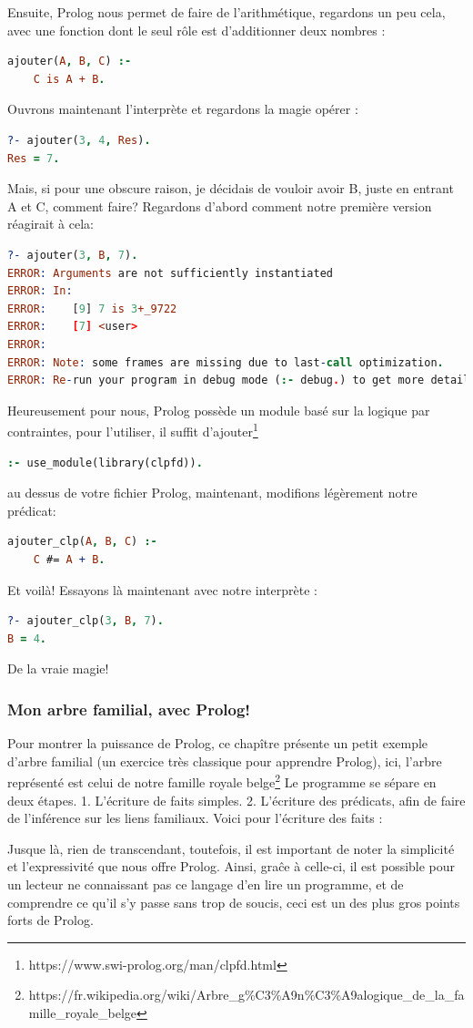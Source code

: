 \documentclass[a4paper, 12pt]{article}
\numberwithin{equation}{subsection}
\begin{document}
Ensuite, Prolog nous permet de faire de l'arithmétique, regardons un peu cela, avec une fonction dont le seul rôle est d'additionner deux nombres :
\begin{lstlisting}[language=Prolog]
ajouter(A, B, C) :-
    C is A + B.
\end{lstlisting}
Ouvrons maintenant l'interprète et regardons la magie opérer :
\begin{lstlisting}[language=Prolog]
?- ajouter(3, 4, Res).
Res = 7.
\end{lstlisting}
Mais, si pour une obscure raison, je décidais de vouloir avoir B, juste en entrant A et C, comment faire? Regardons d'abord comment notre première version réagirait à cela:
\begin{lstlisting}[language=Prolog]
?- ajouter(3, B, 7).
ERROR: Arguments are not sufficiently instantiated
ERROR: In:
ERROR:    [9] 7 is 3+_9722
ERROR:    [7] <user>
ERROR:
ERROR: Note: some frames are missing due to last-call optimization.
ERROR: Re-run your program in debug mode (:- debug.) to get more detail.
\end{lstlisting}
Heureusement pour nous, Prolog possède un module basé sur la logique par contraintes, pour l'utiliser, il suffit d'ajouter\footnote{https://www.swi-prolog.org/man/clpfd.html}
\begin{lstlisting}[language=Prolog]
:- use_module(library(clpfd)).
\end{lstlisting}
au dessus de votre fichier Prolog, maintenant, modifions légèrement notre prédicat:
\begin{lstlisting}[language=Prolog]
ajouter_clp(A, B, C) :-
    C #= A + B.
\end{lstlisting}
Et voilà! Essayons là maintenant avec notre interprète :
\begin{lstlisting}[language=Prolog]
?- ajouter_clp(3, B, 7).
B = 4.
\end{lstlisting}
De la vraie magie!
\subsubsection{Mon arbre familial, avec Prolog!}
Pour montrer la puissance de Prolog, ce chapître présente un petit exemple d'arbre familial (un exercice très classique pour apprendre Prolog), ici, l'arbre représenté est celui de notre famille royale belge\footnote{https://fr.wikipedia.org/wiki/Arbre\_g\%C3\%A9n\%C3\%A9alogique\_de\_la\_famille\_royale\_belge}
Le programme se sépare en deux étapes.
1. L'écriture de faits simples.
2. L'écriture des prédicats, afin de faire de l'inférence sur les liens familiaux.
Voici pour l'écriture des faits :

Jusque là, rien de transcendant, toutefois, il est important de noter la simplicité et l'expressivité que nous offre Prolog. Ainsi, graĉe à celle-ci, il est possible pour un lecteur ne connaissant pas ce langage d'en lire un programme, et de comprendre ce qu'il s'y passe sans trop de soucis, ceci est un des plus gros points forts de Prolog. \\
\end{document}

